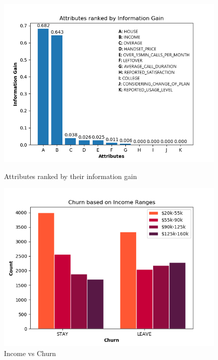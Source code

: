 \documentclass[12pt, notitlepage]{article}
\begin{document}
\begin{figure}[H]
	\centering
	\includegraphics[scale=0.8]{InformationGain.png}
	\caption{Attributes ranked by their information gain}
	\centering 
	\includegraphics[scale=0.8]{IncomeVsChurn.png}
	\caption{Income vs Churn}
\end{figure}
\end{document}
